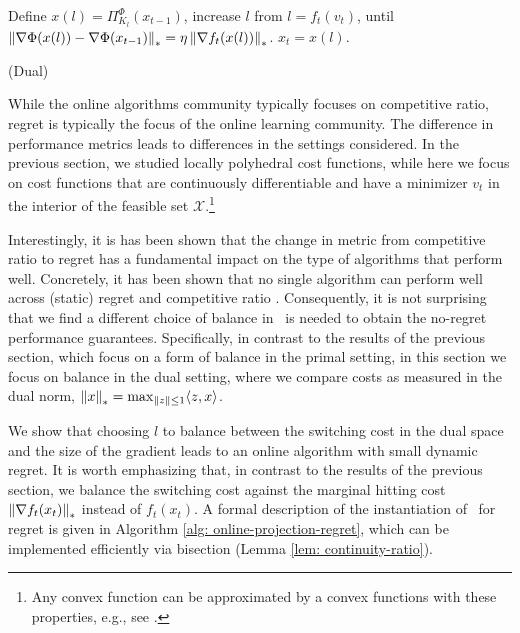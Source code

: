 
\begin{algorithm} [t]
\begin{algorithmic}[1]
			\STATE Define $x(l) = \Pi^\Phi_{K_l}(x_{t-1})$, increase $l$ from $l=f_t(v_t)$, until $\left\lVert \nabla \Phi(x(l)) - \nabla \Phi(x_{t-1}) \right\rVert_* = \eta \left\lVert \nabla f_t (x(l)) \right\rVert_*$. 
			\label{projection-step-regret}
			\STATE $x_t =  x(l)$.
			\ENDFOR
\end{algorithmic}
\caption{(Dual) \ouralg}
\label{alg: online-projection-regret}
\end{algorithm}

While the online algorithms community typically focuses on competitive ratio, regret is typically the focus of the online learning community. The difference in performance metrics leads to differences in the settings considered.  In the previous section, we studied locally polyhedral cost functions, while here we focus on cost functions that are continuously differentiable and have a minimizer $v_t$ in the interior of the feasible set $\mathcal{X}$.\footnote{Any convex function can be approximated by a convex functions with these properties, e.g., see \cite{nesterov2005}.%
}  

Interestingly, it is has been shown that the change in metric from competitive ratio to regret has a fundamental impact on the type of algorithms that perform well. Concretely, it has been shown that no single algorithm can perform well across (static) regret and competitive ratio \citep{andrew2013}.  Consequently, it is not surprising that we find a different choice of balance in \ourack\ is needed to obtain the no-regret performance guarantees.  Specifically, in contrast to the results of the previous section, which focus on a form of balance in the primal setting, in this section we focus on balance in the dual setting, where we compare costs as measured in the dual norm, $\left\lVert x \right\rVert_* = \max_{\left\lVert z \right\rVert \le 1} \langle z, x \rangle$. 

We show that choosing  $l$ to balance between the switching cost in the dual space and the size of the gradient leads to an online algorithm with small dynamic regret. It is worth emphasizing that, in contrast to the results of the previous section, we balance the switching cost against the marginal hitting cost $\left\lVert \nabla f_t(x_t) \right\rVert_*$ instead of $f_t(x_t)$. A formal description of the instantiation of \ourack\ for regret is given in Algorithm \ref{alg: online-projection-regret}, which can be implemented efficiently via bisection (Lemma \ref{lem: continuity-ratio}).%

